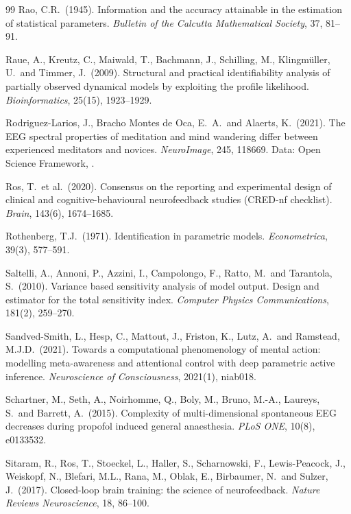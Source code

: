 \begin{thebibliography}{99}
Rao, C.R.\ (1945).
Information and the accuracy attainable in the estimation of statistical parameters.
\textit{Bulletin of the Calcutta Mathematical Society}, 37, 81--91.

Raue, A., Kreutz, C., Maiwald, T., Bachmann, J., Schilling, M., Klingm\"uller, U.\ and Timmer, J.\ (2009).
Structural and practical identifiability analysis of partially observed dynamical models by exploiting the profile likelihood.
\textit{Bioinformatics}, 25(15), 1923--1929.

Rodriguez-Larios, J., Bracho Montes de Oca, E.\ A.\ and Alaerts, K.\ (2021).
The EEG spectral properties of meditation and mind wandering differ between experienced meditators and novices.
\textit{NeuroImage}, 245, 118669. Data: Open Science Framework, .

Ros, T.\ et al.\ (2020).
Consensus on the reporting and experimental design of clinical and cognitive-behavioural neurofeedback studies (CRED-nf checklist).
\textit{Brain}, 143(6), 1674--1685.

Rothenberg, T.J.\ (1971).
Identification in parametric models.
\textit{Econometrica}, 39(3), 577--591.

Saltelli, A., Annoni, P., Azzini, I., Campolongo, F., Ratto, M.\ and Tarantola, S.\ (2010).
Variance based sensitivity analysis of model output. Design and estimator for the total sensitivity index.
\textit{Computer Physics Communications}, 181(2), 259--270.

Sandved-Smith, L., Hesp, C., Mattout, J., Friston, K., Lutz, A.\ and Ramstead, M.J.D.\ (2021).
Towards a computational phenomenology of mental action: modelling meta-awareness and attentional control with deep parametric active inference.
\textit{Neuroscience of Consciousness}, 2021(1), niab018.

Schartner, M., Seth, A., Noirhomme, Q., Boly, M., Bruno, M.-A., Laureys, S.\ and Barrett, A.\ (2015).
Complexity of multi-dimensional spontaneous EEG decreases during propofol induced general anaesthesia.
\textit{PLoS ONE}, 10(8), e0133532.

Sitaram, R., Ros, T., Stoeckel, L., Haller, S., Scharnowski, F., Lewis-Peacock, J., Weiskopf, N., Blefari, M.L., Rana, M., Oblak, E., Birbaumer, N.\ and Sulzer, J.\ (2017).
Closed-loop brain training: the science of neurofeedback.
\textit{Nature Reviews Neuroscience}, 18, 86--100.


\end{thebibliography}
